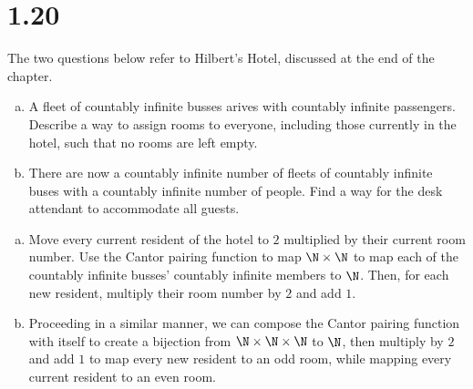 \documentclass[10pt]{mypackage}
\begin{document}
\section{1.20}%
\begin{problem}
  The two questions below refer to Hilbert's Hotel, discussed at the end of the chapter.
  \begin{enumerate}[(a)]
    \item A fleet of countably infinite busses arives with countably infinite passengers. Describe a way to assign rooms to everyone, including those currently in the hotel, such that no rooms are left empty.
    \item There are now a countably infinite number of fleets of countably infinite buses with a countably infinite number of people. Find a way for the desk attendant to accommodate all guests.
  \end{enumerate}
\end{problem}
\begin{solution}\hfill
  \begin{enumerate}[(a)]
    \item Move every current resident of the hotel to $2$ multiplied by their current room number. Use the Cantor pairing function to map $\N\times \N$ to map each of the countably infinite busses' countably infinite members to $\N$. Then, for each new resident, multiply their room number by $2$ and add $1$.
    \item Proceeding in a similar manner, we can compose the Cantor pairing function with itself to create a bijection from $\N\times\N\times \N$ to $\N$, then multiply by $2$ and add $1$ to map every new resident to an odd room, while mapping every current resident to an even room.
  \end{enumerate}
\end{solution}
\end{document}
